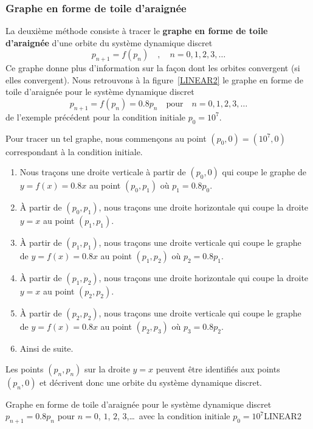 {

\subsubsection{Graphe en forme de toile d'araignée}

La deuxième méthode consiste à tracer le
{\bfseries graphe en forme de toile d'araignée} d'une orbite du
système dynamique discret
\[
p_{n+1} = f(p_n) \quad , \quad n=0, 1, 2, 3, \ldots
\]
Ce graphe donne plus d'information sur la façon dont les orbites
convergent (si elles convergent).  Nous retrouvons à la
figure~\ref{LINEAR2} le graphe en forme de toile d'araignée pour le
système dynamique discret
\[
p_{n+1} = f(p_n) = 0.8 p_n \quad \text{pour} \quad n=0, 1, 2, 3, \ldots
\]
de l'exemple précédent pour la condition initiale $p_0 = 10^7$.

Pour tracer un tel graphe, nous commençons au point $(p_0,0) = (10^7,0)$
correspondant à la condition initiale.
\begin{enumerate}
\item Nous traçons une droite verticale à partir de $(p_0,0)$ qui coupe le
graphe de $y= f(x) = 0.8x$ au point $(p_0, p_1)$ où $p_1=0.8 p_0$. 
\item À partir de $(p_0,p_1)$, nous traçons une droite horizontale qui
coupe la droite $y=x$ au point $(p_1,p_1)$.
\item À partir de $(p_1,p_1)$, nous traçons une droite verticale qui coupe
le graphe de $y= f(x) = 0.8 x$ au point $(p_1,p_2)$ où $p_2=0.8 p_1$.
\item À partir de $(p_1,p_2)$, nous traçons une droite horizontale qui
coupe la droite $y=x$ au point $(p_2,p_2)$.
\item À partir de $(p_2,p_2)$, nous traçons une droite verticale qui coupe
le graphe de $y= f(x) = 0.8 x$ au point $(p_2,p_3)$ où $p_3=0.8 p_2$.
\item Ainsi de suite.
\end{enumerate}

Les points $(p_n,p_n)$ sur la droite $y=x$ peuvent être identifiés aux
points $(p_n,0)$ et décrivent donc une orbite du système dynamique
discret.

{Graphe en forme de toile d'araignée pour le système dynamique
discret $p_{n+1} = 0.8 p_n$ pour $n=0$, $1$, $2$, $3$,\ldots\ avec la
condition initiale $p_0 =10^7$}{LINEAR2}

}
